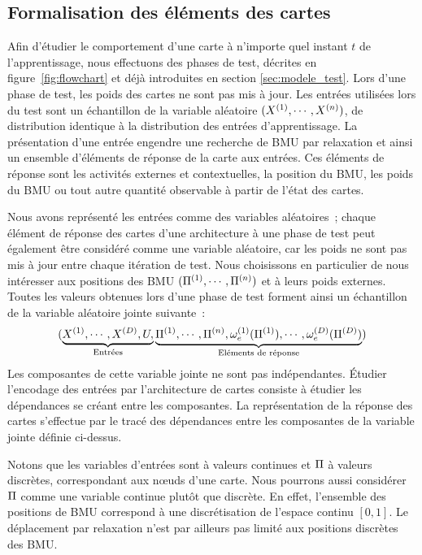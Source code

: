 \documentclass[../main]{subfiles}
\begin{document}
\subsection{Formalisation des éléments des cartes}

Afin d'étudier le comportement d'une carte à n'importe quel instant $t$ de l'apprentissage, nous effectuons des phases de test, décrites en figure~\ref{fig:flowchart} et déjà introduites en section \ref{sec:modele_test}. Lors d'une phase de test, les poids des cartes ne sont pas mis à jour. 
Les entrées utilisées lors du test sont un échantillon de la variable aléatoire $(X^{({1})}, \cdots, X^{({n})})$, de distribution identique à la distribution des entrées d'apprentissage.
La présentation d'une entrée engendre une recherche de BMU par relaxation et ainsi un ensemble d'éléments de réponse de la carte aux entrées. Ces éléments de réponse sont les activités externes et contextuelles, la position du BMU, les poids du BMU ou tout autre quantité observable à partir de l'état des cartes.

Nous avons représenté les entrées comme des variables aléatoires~; chaque élément de réponse des cartes d'une architecture à une phase de test peut également être considéré comme une variable aléatoire, car les poids ne sont pas mis à jour entre chaque itération de test.
Nous choisissons en particulier de nous intéresser aux positions des BMU $(\Pi^{({1})}, \cdots, \Pi^{({n})})$ et à leurs poids externes.
Toutes les valeurs obtenues lors d'une phase de test forment ainsi un échantillon de la variable aléatoire jointe suivante~:
$$(\underbrace{X^{({1})}, \cdots, X^{({D})}, U,}_{\text{Entrées}} \underbrace{\Pi^{({1})}, \cdots, \Pi^{({n})}, \omega_e^{({1})}(\Pi^{({1})}), \cdots, \omega_e^{({D})}(\Pi^{({D})})}_{\text{Eléments de réponse}})$$
Les composantes de cette variable jointe ne sont pas indépendantes. \'Etudier l'encodage des entrées par l'architecture de cartes consiste à étudier les dépendances se créant entre les composantes.
La représentation de la réponse des cartes s'effectue par le tracé des dépendances entre les composantes de la variable jointe définie ci-dessus.


Notons que les variables d'entrées sont à valeurs continues et $\Pi$ à valeurs discrètes, correspondant aux n\oe{}uds d'une carte.
Nous pourrons aussi considérer $\Pi$ comme une variable continue plutôt que discrète.
En effet, l'ensemble des positions de BMU correspond à une discrétisation de l'espace continu $[0,1]$. Le déplacement par relaxation n'est par ailleurs pas limité aux positions discrètes des BMU.
\end{document}
